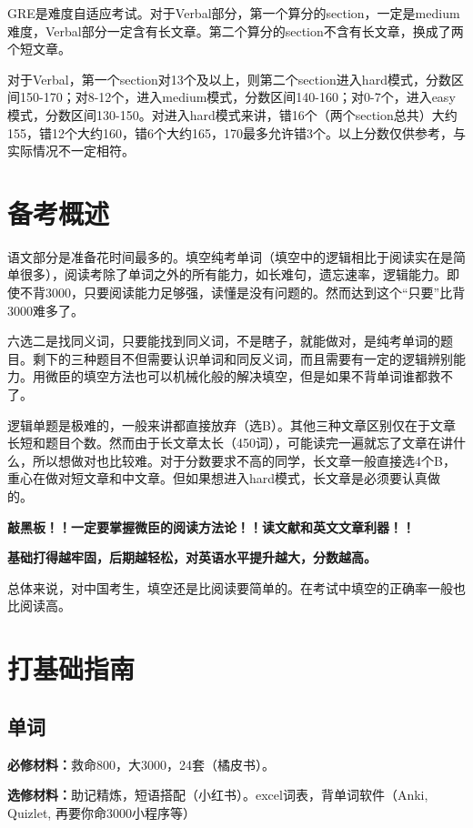 \documentclass[cn,plain]{./src/qyxfbook}
\newenvironment{material}{\begin{tcolorbox}[title={材料}]}{\end{tcolorbox}}
\newcommand{\red}[1]{\textcolor[rgb]{1,0,0}{#1}}
\begin{document}
			
			GRE是难度自适应考试。对于Verbal部分，第一个算分的section，一定是medium难度，Verbal部分一定含有长文章。第二个算分的section不含有长文章，换成了两个短文章。\par
			对于Verbal，第一个section对13个及以上，则第二个section进入hard模式，分数区间150-170；对8-12个，进入medium模式，分数区间140-160；对0-7个，进入easy模式，分数区间130-150。对进入hard模式来讲，错16个（两个section总共）大约155，错12个大约160，错6个大约165，170最多允许错3个。以上分数仅供参考，与实际情况不一定相符。
		
	
		\section{备考概述}
			语文部分是准备花时间最多的。填空纯考单词（填空中的逻辑相比于阅读实在是简单很多），阅读考除了单词之外的所有能力，如长难句，遗忘速率，逻辑能力。即使不背3000，只要阅读能力足够强，读懂是没有问题的。然而达到这个“只要”比背3000难多了。\par
			六选二是找同义词，只要能找到同义词，不是瞎子，就能做对，是纯考单词的题目。剩下的三种题目不但需要认识单词和同反义词，而且需要有一定的逻辑辨别能力。用微臣的填空方法也可以机械化般的解决填空，但是如果不背单词\red{\Large 谁都救不了。}\par
			逻辑单题是极难的，一般来讲都直接放弃（选B）。其他三种文章区别仅在于文章长短和题目个数。然而由于长文章太长（450词），可能读完一遍就忘了文章在讲什么，所以想做对也比较难。对于分数要求不高的同学，长文章一般直接选4个B，重心在做对短文章和中文章。但如果想进入hard模式，长文章是必须要认真做的。\par
			\begin{center}
				\red{\Large\bfseries 敲黑板！！一定要掌握微臣的阅读方法论！！读文献和英文文章利器！！}\par
				\red{\Large\bfseries 基础打得越牢固，后期越轻松，对英语水平提升越大，分数越高。}\par
			\end{center}
			\hspace{2em}总体来说，对中国考生，填空还是比阅读要简单的。在考试中填空的正确率一般也比阅读高。
		
	
		\section{打基础指南}
			
			\subsection{单词}
				\begin{material}
				\textbf{必修材料：}救命800，大3000，24套（橘皮书）。\par
				\textbf{选修材料：}助记精炼，短语搭配（小红书）。excel词表，背单词软件（Anki, Quizlet, 再要你命3000小程序等）

			\end{material}
		
\end{document}
